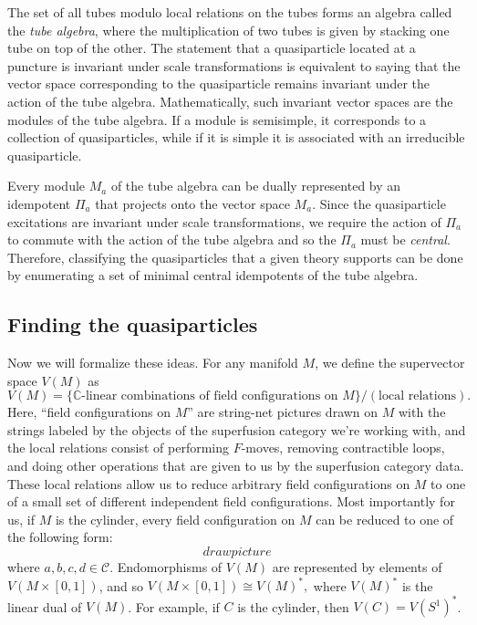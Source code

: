 \documentclass[12pt,a4paper]{article}
\newcommand{\cc}{\mathbb{C}}
\newcommand\be            {\begin{equation}}
\newcommand\ee            {\end{equation}}
\newcommand{\mcc}{\mathcal{C}}
\begin{document}
The set of all tubes modulo local relations on the tubes forms an algebra called the {\it tube algebra}, where the multiplication of two tubes is given by stacking one tube on top of the other. The statement that a quasiparticle located at a puncture is invariant under scale transformations is equivalent to saying that the vector space corresponding to the quasiparticle remains invariant under the action of the tube algebra. Mathematically, such invariant vector spaces are the modules of the tube algebra. If a module is semisimple, it corresponds to a collection of quasiparticles, while if it is simple it is associated with an irreducible quasiparticle. 

Every module $M_a$ of the tube algebra can be dually represented by an idempotent $\Pi_a$ that projects onto the vector space $M_a$. Since the quasiparticle excitations are invariant under scale transformations, we require the action of $\Pi_a$ to commute with the action of the tube algebra and so the $\Pi_a$ must be {\it central}. Therefore, classifying the quasiparticles that a given theory supports can be done by enumerating a set of minimal central idempotents of the tube algebra. 

\subsection{Finding the quasiparticles}

Now we will formalize these ideas. For any manifold $M$, we define the supervector space $V(M)$ as 
\be V(M) = \{\text{$\cc$-linear combinations of field configurations on $M$}\} / (\text{local relations}). \ee
Here, ``field configurations on $M$'' are string-net pictures drawn on $M$ with the strings labeled by the objects of the superfusion category we're working with, and the local relations consist of performing $F$-moves, removing contractible loops, and doing other operations that are given to us by the superfusion category data. These local relations allow us to reduce arbitrary field configurations on $M$ to one of a small set of different independent field configurations. Most importantly for us, if $M$ is the cylinder, every field configuration on $M$ can be reduced to one of the following form:
\be draw picture \ee
where $a,b,c,d \in \mcc$. Endomorphisms of $V(M)$ are represented by elements of $V(M\times [0,1])$, and so $V(M\times[0,1]) \cong V(M)^*,$
where $V(M)^*$ is the linear dual of $V(M)$. For example, if $C$ is the cylinder, then $V(C) = V(S^1)^*$. 
\end{document}
